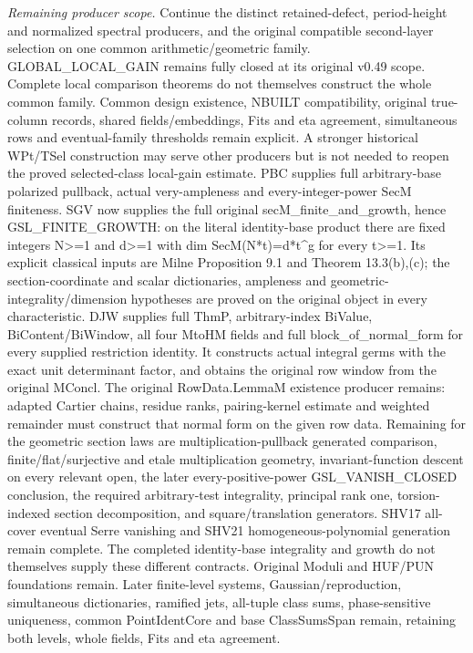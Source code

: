 \documentclass[11pt,a4paper]{article}
\numberwithin{equation}{section}
\theoremstyle{remark}\newtheorem{remark}[theorem]{Remark}
\begin{document}
\emph{Remaining producer scope.} Continue the distinct retained-defect, period-height and normalized spectral producers, and the original compatible second-layer selection on one common arithmetic/geometric family. GLOBAL\_\allowbreak LOCAL\_\allowbreak GAIN remains fully closed at its original v0.49 scope. Complete local comparison theorems do not themselves construct the whole common family. Common design existence, NBUILT compatibility, original true-column records, shared fields/embeddings, Fits and eta agreement, simultaneous rows and eventual-family thresholds remain explicit. A stronger historical WPt/TSel construction may serve other producers but is not needed to reopen the proved selected-class local-gain estimate. PBC supplies full arbitrary-base polarized pullback, actual very-ampleness and every-integer-power SecM finiteness. SGV now supplies the full original secM\_\allowbreak finite\_\allowbreak and\_\allowbreak growth, hence GSL\_\allowbreak FINITE\_\allowbreak GROWTH: on the literal identity-base product there are fixed integers N>=1 and d>=1 with dim SecM(N*t)=d*t\textasciicircum{}g for every t>=1. Its explicit classical inputs are Milne Proposition 9.1 and Theorem 13.3(b),(c); the section-coordinate and scalar dictionaries, ampleness and geometric-integrality/dimension hypotheses are proved on the original object in every characteristic. DJW supplies full ThmP, arbitrary-index BiValue, BiContent/BiWindow, all four MtoHM fields and full block\_\allowbreak of\_\allowbreak normal\_\allowbreak form for every supplied restriction identity. It constructs actual integral germs with the exact unit determinant factor, and obtains the original row window from the original MConcl. The original RowData.LemmaM existence producer remains: adapted Cartier chains, residue ranks, pairing-kernel estimate and weighted remainder must construct that normal form on the given row data. Remaining for the geometric section laws are multiplication-pullback generated comparison, finite/flat/surjective and etale multiplication geometry, invariant-function descent on every relevant open, the later every-positive-power GSL\_\allowbreak VANISH\_\allowbreak CLOSED conclusion, the required arbitrary-test integrality, principal rank one, torsion-indexed section decomposition, and square/translation generators. SHV17 all-cover eventual Serre vanishing and SHV21 homogeneous-polynomial generation remain complete. The completed identity-base integrality and growth do not themselves supply these different contracts. Original Moduli and HUF/PUN foundations remain. Later finite-level systems, Gaussian/reproduction, simultaneous dictionaries, ramified jets, all-tuple class sums, phase-sensitive uniqueness, common PointIdentCore and base ClassSumsSpan remain, retaining both levels, whole fields, Fits and eta agreement.
\end{document}
